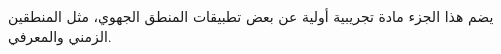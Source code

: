 \documentclass[../../include/open-logic-part]{subfiles}
\begin{document}

\begin{editorial}
يضم هذا الجزء مادة تجريبية أولية عن بعض تطبيقات المنطق الجهوي، مثل المنطقين
الزمني والمعرفي.
\end{editorial}



\OLEndPartHook
\end{document}
